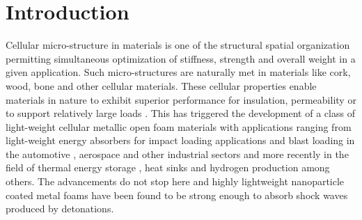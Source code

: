 \chapter{Introduction}

Cellular micro-structure in materials is one of the structural spatial organization permitting simultaneous optimization of stiffness, strength and overall weight in a given application. Such micro-structures are naturally met in materials like cork, wood, bone and other cellular materials. These cellular properties enable materials in nature to exhibit superior performance for insulation, permeability or to support relatively large loads \cite{ashbyMechanicalPropertiesCellular1983,gibsonCellularSolidsStructure1997}. This has triggered the development of a class of light-weight cellular metallic open foam materials with applications ranging from light-weight energy absorbers for impact loading applications and blast loading in the automotive \cite{banhartManufactureCharacterisationApplication2001}, aerospace \cite{destefanisSelectingEnhancedSpace2006} and other industrial sectors \cite{maEnergyAbsorptionDoublelayer2007,hanssenCloserangeBlastLoading2002} {and more recently in the field of thermal energy storage \cite{digiorgioNumericalAnalysisParaffin2017,liExperimentalNumericalStudies2012}, heat sinks \cite{andreozziNumericalStudyMetal2017,shihExperimentalInvestigationHeat2007} and hydrogen production \cite{villafan-vidalesHeatTransferSimulation2011} among others}. The advancements do not stop here and highly lightweight nanoparticle coated metal foams have been found to be strong enough to absorb shock waves produced by detonations\cite{NanocoatingMakesLightweight}.


